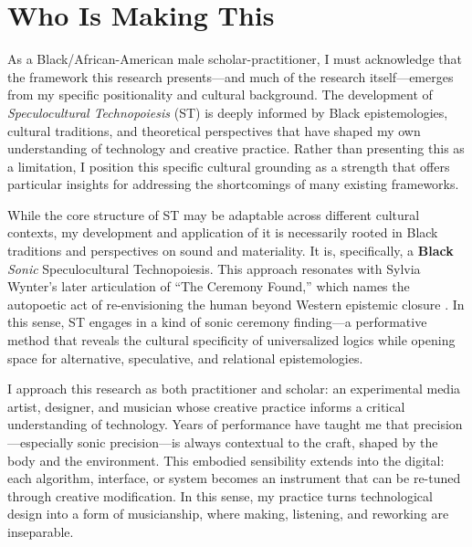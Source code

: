 %

\section*{Who Is Making This}

As a Black/African-American male scholar-practitioner, I must acknowledge that the framework this research presents---and much of the research itself---emerges from my specific positionality and cultural background. The development of \textit{Speculocultural Technopoiesis} (ST) is deeply informed by Black epistemologies, cultural traditions, and theoretical perspectives that have shaped my own understanding of technology and creative practice. Rather than presenting this as a limitation, I position this specific cultural grounding as a strength that offers particular insights for addressing the shortcomings of many existing frameworks.

While the core structure of ST may be adaptable across different cultural contexts, my development and application of it is necessarily rooted in Black traditions and perspectives on sound and materiality. It is, specifically, a \textbf{Black} \textit{Sonic} Speculocultural Technopoiesis. This approach resonates with Sylvia Wynter's later articulation of ``The Ceremony Found,'' which names the autopoetic act of re-envisioning the human beyond Western epistemic closure \parencite{Wynter_2015}. In this sense, ST engages in a kind of sonic ceremony finding---a performative method that reveals the cultural specificity of universalized logics while opening space for alternative, speculative, and relational epistemologies.

I approach this research as both practitioner and scholar: an experimental media artist, designer, and musician whose creative practice informs a critical understanding of technology. Years of performance have taught me that precision---especially sonic precision---is always contextual to the craft, shaped by the body and the environment. This embodied sensibility extends into the digital: each algorithm, interface, or system becomes an instrument that can be re-tuned through creative modification. In this sense, my practice turns technological design into a form of musicianship, where making, listening, and reworking are inseparable.


